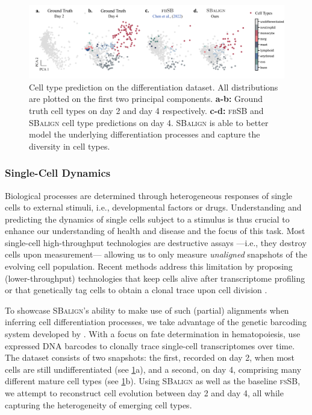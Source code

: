 \begin{figure}[t]
    \centering
    \includegraphics[width=\textwidth]{figures/fig_cell_pred_types.pdf}
    \caption{Cell type prediction on the differentiation dataset. All distributions are plotted on the first two principal components. \textbf{a-b:} Ground truth cell types on day 2 and day 4 respectively. \textbf{c-d:} \textsc{fbSB} and \textsc{SBalign} cell type predictions on day 4. \textsc{SBalign} is able to better model the underlying differentiation processes and capture the diversity in cell types.}
    \label{fig:results_cell_class}
\end{figure}

\subsubsection{Single-Cell Dynamics}
\label{sec:sbalign_cell}

 Biological processes are determined through heterogeneous responses of single cells to external stimuli, i.e., developmental factors or drugs. Understanding and predicting the dynamics of single cells subject to a stimulus is thus crucial to enhance our understanding of health and disease and the focus of this task.
Most single-cell high-throughput technologies are destructive assays ---i.e., they destroy cells upon measurement--- allowing us to only measure \textit{unaligned} snapshots of the evolving cell population. Recent methods address this limitation by proposing (lower-throughput) technologies that keep cells alive after transcriptome profiling \citep{chen2022live} or that genetically tag cells to obtain a clonal trace upon cell division \citep{weinreb2020lineage}.

To showcase \textsc{SBalign}'s ability to make use of such (partial) alignments when inferring cell differentiation processes, we take advantage of the genetic barcoding system developed by \citet{weinreb2020lineage}. With a focus on fate determination in hematopoiesis, \citet{weinreb2020lineage} use expressed DNA barcodes to clonally trace single-cell transcriptomes over time. The dataset consists of two snapshots: the first, recorded on day 2, when most cells are still undifferentiated (see \cref{fig:results_cell_class}a), and a second, on day 4, comprising many different mature cell types (see \cref{fig:results_cell_class}b). Using \textsc{SBalign} as well as the baseline \textsc{fsSB}, we attempt to reconstruct cell evolution between day 2 and day 4, all while capturing the heterogeneity of emerging cell types.

